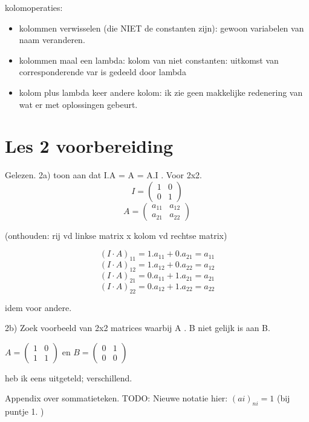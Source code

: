 \documentclass{article}
\begin{document}
kolomoperaties: 
\begin{itemize}
    \item kolommen verwisselen (die NIET de constanten zijn): gewoon variabelen van naam veranderen. 
    \item kolommen maal een lambda: 
kolom van niet constanten: uitkomst van corresponderende var is gedeeld door lambda
\item kolom plus lambda keer andere kolom: ik zie geen makkelijke redenering van wat er met oplossingen gebeurt. 

\end{itemize}



\section{Les 2 voorbereiding}

Gelezen. 
2a) toon aan dat I.A = A = A.I . Voor 2x2. 
\[I = 
\begin{pmatrix}
1  & 0 \\
0  & 1    
\end{pmatrix}
 \]
\[
A = 
\begin{pmatrix}
a_{11} & a_{12} \\
a_{21} & a_{22}
\end{pmatrix}
\]

(onthouden: rij vd linkse matrix x kolom vd rechtse matrix) 

\[(I \cdot A)_{11} = 1.a_{11} + 0.a_{21} =a_{11} \]
\[(I \cdot A)_{12} = 1.a_{12} + 0.a_{22} = a_{12}\]
\[(I \cdot A)_{21} = 0.a_{11} + 1.a_{21}  =a_{21}\]
\[(I \cdot A)_{22} = 0.a_{12} + 1.a_{22} =a_{22}\]


idem voor andere. 

2b) 
Zoek voorbeeld van 2x2 matrices waarbij A . B niet gelijk is aan B. 

$A = \begin{pmatrix} 1 & 0\\ 1 & 1  \end{pmatrix}$ 
en $B = \begin{pmatrix}0 & 1 \\0 & 0 \end{pmatrix}$  

heb ik eens uitgeteld; verschillend. 


Appendix over sommatieteken. 
TODO: Nieuwe notatie hier: $(ai)_{ni}=1$  
(bij puntje 1. ) 
\end{document}

